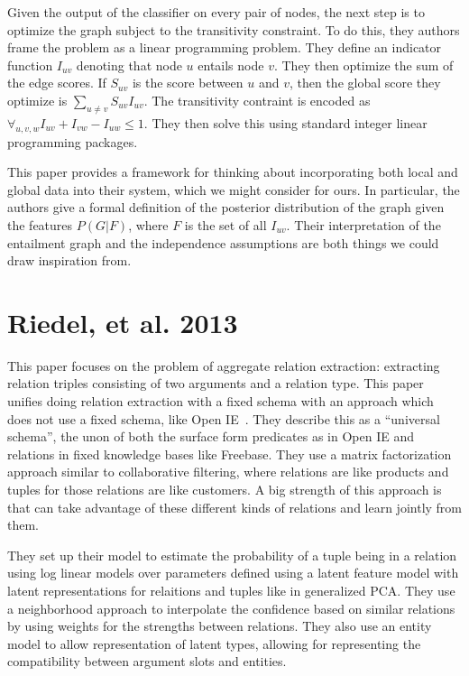 \documentclass{article}
\begin{document}
Given the output of the classifier on every pair of nodes, the next step is to optimize the graph subject to the transitivity constraint. To do this, they authors frame the problem as a linear programming problem. They define an indicator function $I_{uv}$ denoting that node $u$ entails node $v$. They then optimize the sum of the edge scores. If $S_{uv}$ is the score between $u$ and $v$, then the global score they optimize is $\sum_{u \neq v} S_{uv}I_{uv}$. The transitivity contraint is encoded as $\forall_{u, v, w} I_{uv} + I_{vw} - I_{uw} \leq 1$. They then solve this using standard integer linear programming packages.

This paper provides a framework for thinking about incorporating both local and global data into their system, which we might consider for ours. In particular, the authors give a formal definition of the posterior distribution of the graph given the features $P(G|F)$, where $F$ is the set of all $I_{uv}$. Their interpretation of the entailment graph and the independence assumptions are both things we could draw inspiration from.

\section*{Riedel, et al. 2013}

This paper focuses on the problem of aggregate relation extraction: extracting relation triples consisting of two arguments and a relation type. This paper unifies doing relation extraction with a fixed schema with an approach which does not use a fixed schema, like Open IE~\cite{Etzioni:2008:OIE:1409360.1409378}. They describe this as a ``universal schema'', the unon of both the surface form predicates as in Open IE and relations in fixed knowledge bases like Freebase. They use a matrix factorization approach similar to collaborative filtering, where relations are like products and tuples for those relations are like customers. A big strength of this approach is that can take advantage of these different kinds of relations and learn jointly from them.

They set up their model to estimate the probability of a tuple being in a relation using log linear models over parameters defined using a latent feature model with latent representations for relaitions and tuples like in generalized PCA. They use a neighborhood approach to interpolate the confidence based on similar relations by using weights for the strengths between relations. They also use an entity model to allow representation of latent types, allowing for representing the compatibility between argument slots and entities.
\end{document}
